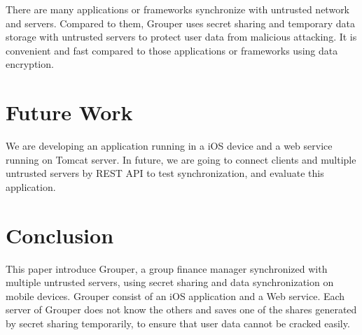 \documentclass[twocolumn,10pt]{article}
\begin{document}
There are many applications or frameworks synchronize with untrusted network and servers. Compared to them, Grouper uses secret sharing and temporary data storage with untrusted servers to protect user data from malicious attacking. It is convenient and fast compared to those applications or frameworks using data encryption.

\section{Future Work}

We are developing an application running in a iOS device and a web service running on Tomcat server. In future, we are going to connect clients and multiple untrusted servers by REST API to test synchronization, and evaluate this application.

\section{Conclusion}

This paper introduce Grouper, a group finance manager synchronized with multiple untrusted servers, using secret sharing and data synchronization on mobile devices. Grouper consist of an iOS application and a Web service.  Each server of Grouper does not know the others and saves one of the shares generated by secret sharing temporarily, to ensure that user data cannot be cracked easily. 


{
	\footnotesize
	
}
\end{document}

